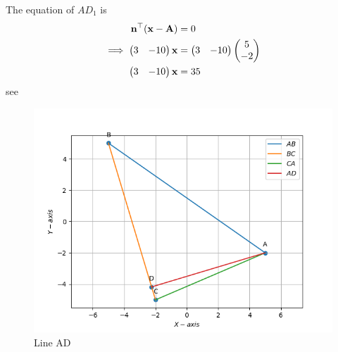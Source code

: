 \documentclass[11pt]{book}
\begin{document}
\begin{enumerate}[label=\thesection.\arabic*.,ref=\thesection.\theenumi]
The equation of $AD_1$ is
\begin{align}
 \mathbf{n}^{\top}(\mathbf{x-A}) &= 0 \\
\implies \begin{pmatrix}3 & -10\end{pmatrix}\mathbf{x} &= \begin{pmatrix}3 & -10\end{pmatrix}\begin{pmatrix}5 \\ -2\end{pmatrix}\\
\begin{pmatrix}3 & -10\end{pmatrix}\mathbf{x} &= 35
\end{align}
see 
\begin{figure}[H]
    \centering
    \includegraphics[width=\columnwidth]{figs/AD1_altitude.png}
    \caption{Line AD}
    \label{fig:line_ad}
\end{figure}
 

\end{enumerate}
\end{document}
